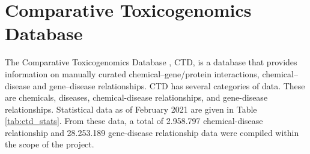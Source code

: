 \section{Comparative Toxicogenomics Database}
The Comparative Toxicogenomics Database \cite{davis2021comparative}, CTD, is a database that provides information on manually curated chemical–gene/protein interactions, chemical–disease and gene–disease relationships. CTD has several categories of data. These are chemicals, diseases, chemical-disease relationships, and gene-disease relationships. Statistical data as of February 2021 are given in Table \ref{tab:ctd_stats}. From these data, a total of 2.958.797 chemical-disease relationship and 28.253.189 gene-disease relationship data were compiled within the scope of the project.

